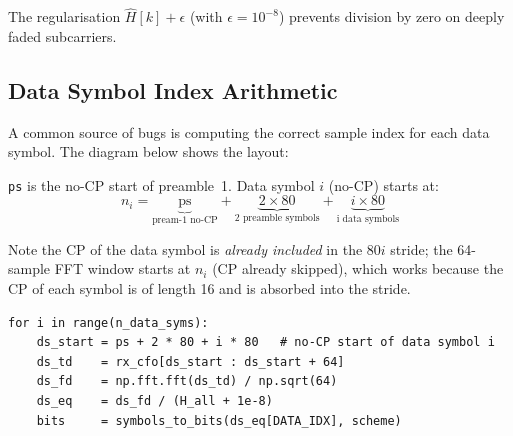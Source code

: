 \documentclass[11pt,a4paper]{article}
\begin{document}
The regularisation $\hat{H}[k] + \epsilon$ (with $\epsilon = 10^{-8}$) prevents
division by zero on deeply faded subcarriers.

\subsection{Data Symbol Index Arithmetic}

A common source of bugs is computing the correct sample index for each data
symbol.  The diagram below shows the layout:

\begin{center}
\end{center}

\texttt{ps} is the no-CP start of preamble~1.  Data symbol $i$ (no-CP) starts at:
\begin{equation}
  \label{eq:ds_start}
  n_i = \underbrace{\text{ps}}_{\text{pream-1 no-CP}}
        + \underbrace{2 \times 80}_{\text{2 preamble symbols}}
        + \underbrace{i \times 80}_{\text{i data symbols}}
\end{equation}

Note the CP of the data symbol is \emph{already included} in the $80i$ stride;
the 64-sample FFT window starts at $n_i$ (CP already skipped), which works
because the CP of each symbol is of length 16 and is absorbed into the stride.

\begin{lstlisting}
for i in range(n_data_syms):
    ds_start = ps + 2 * 80 + i * 80   # no-CP start of data symbol i
    ds_td    = rx_cfo[ds_start : ds_start + 64]
    ds_fd    = np.fft.fft(ds_td) / np.sqrt(64)
    ds_eq    = ds_fd / (H_all + 1e-8)
    bits     = symbols_to_bits(ds_eq[DATA_IDX], scheme)
\end{lstlisting}
\end{document}
